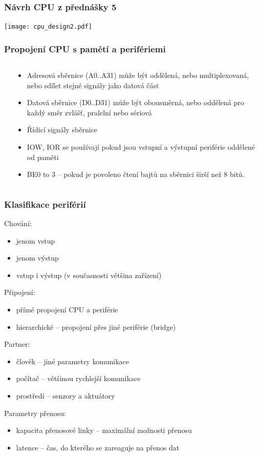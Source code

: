 \documentclass{beamer}
\begin{document}
\begin{frame}
\frametitle{Návrh CPU z přednášky 5}
\texttt{[image: cpu\_design2.pdf]}
\end{frame}

\begin{frame}
\frametitle{Propojení CPU s pamětí a perifériemi}
\begin{columns}
\begin{column}{0.4\textwidth}
\end{column}
\begin{column}{0.6\textwidth}  
\begin{itemize}
\item Adresová sběrnice (A0..A31) může být oddělená, nebo multiplexovaná, nebo sdílet stejné signály jako datová část
\item Datová sběrnice (D0..D31) může být obousměrná, nebo oddělená pro každý směr zvlášť, pralelní nebo sériová
\item Řídicí signály sběrnice
\item IOW, IOR se používají pokud jsou vstupní a výstupní periférie oddělené od paměti
\item BE0 to 3 -- pokud je povoleno čtení bajtů na sběrnici širší než 8 bitů.
\end{itemize}
\end{column}
\end{columns}
\end{frame}

\begin{frame}
\frametitle{Klasifikace periférií}
Chování:
\begin{itemize}
\item jenom vstup
\item jenom výstup
\item vstup i výstup (v současnosti většina zařízení)
\end{itemize}

Připojení:
\begin{itemize}
\item přímé propojení CPU a periférie
\item hierarchické -- propojení přes jiné periférie (bridge)
\end{itemize}

Partner:
\begin{itemize}
\item člověk -- jiné parametry komunikace
\item počítač -- většinou rychlejší komunikace
\item prostředí -- senzory a aktuátory
\end{itemize}

Parametry přenosu:
\begin{itemize}
\item kapacita přenosové linky -- maximální možnosti přenosu
\item latence -- čas, do kterého se zareaguje na přenos dat
\end{itemize}
\end{frame}
\end{document}

